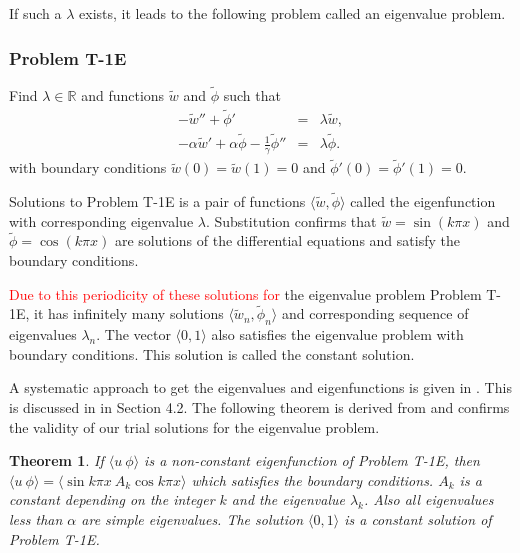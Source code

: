 \documentclass[../../main.tex]{subfiles}
\begin{document}
If such a $\lambda$ exists, it leads to the following problem called an eigenvalue problem.
\subsubsection*{Problem T-1E}\label{sssec:1D_Model:Problem:T1E}
Find $\lambda \in \mathbb{R}$ and functions $\tilde{w}$ and $\tilde{\phi}$ such that
\begin{eqnarray*}
	-\tilde{w}'' + \tilde{\phi}' &=& \lambda \tilde{w}, \label{eq:1D_Model:ProblemT1E1}\\
	-\alpha \tilde{w}' + \alpha\tilde{\phi} - \frac{1}{\gamma}\tilde{\phi}'' &=& \lambda \tilde{\phi}. \label{eq:1D_Model:ProblemT1E2}
\end{eqnarray*} with boundary conditions $\tilde{w}(0) = \tilde{w}(1) = 0$ and $\tilde{\phi}'(0) = \tilde{\phi}'(1) = 0$.

Solutions to Problem T-1E is a pair of functions $\langle \tilde{w}, \tilde{\phi} \rangle$ called the eigenfunction with corresponding eigenvalue $\lambda$. Substitution confirms that $\tilde{w} = \sin(k\pi x)$ and $\tilde{\phi} = \cos(k \pi x)$ are solutions of the differential equations and satisfy the boundary conditions.

\textcolor{red}{Due to this periodicity of these solutions for} the eigenvalue problem Problem T-1E, it has infinitely many solutions $\langle \tilde{w}_n, \tilde{\phi}_n \rangle$ and corresponding sequence of eigenvalues $\lambda_n$. The vector $\langle 0, 1 \rangle$ also satisfies the eigenvalue problem with boundary conditions. This solution is called the constant solution.

A systematic approach to get the eigenvalues and eigenfunctions is given in \cite{VV06}. This is discussed in in Section 4.2. The following theorem is derived from \cite{VV06} and confirms the validity of our trial solutions for the eigenvalue problem.

\newtheorem{ThmVV06}{Theorem}
\begin{ThmVV06}
	If $\langle u \ \phi\rangle$ is a non-constant eigenfunction of Problem T-1E, then $\langle u \ \phi\rangle = \langle\sin k \pi x \ A_k \cos k \pi x\rangle$ which satisfies the boundary conditions. $A_k$ is a constant depending on the integer $k$ and the eigenvalue $\lambda_k$. Also all eigenvalues less than $\alpha$ are simple eigenvalues. The solution $\langle 0, 1 \rangle$ is a constant solution of Problem T-1E.
\end{ThmVV06}
\end{document}
